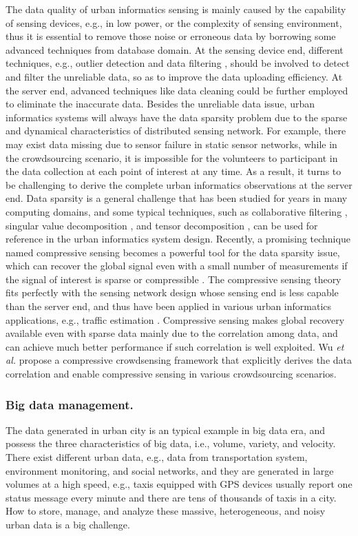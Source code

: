 The data quality of urban informatics sensing is mainly caused by the capability of sensing devices, e.g., in low power, or the complexity of sensing environment, thus it is essential to remove those noise or erroneous data by borrowing some advanced techniques from database domain. At the sensing device end, different techniques, e.g., outlier detection \cite{outlier} and data filtering \cite{crowdscreen}, should be involved to detect and filter the unreliable data, so as to improve the data uploading efficiency. At the server end, advanced techniques like data cleaning \cite{datacleaning} could be further employed to eliminate the inaccurate data. Besides the unreliable data issue, urban informatics systems will always have the data sparsity problem due to the sparse and dynamical characteristics of distributed sensing network. For example, there may exist data missing due to sensor failure in static sensor networks, while in the crowdsourcing scenario, it is impossible for the volunteers to participant in the data collection at each point of interest at any time. As a result, it turns to be challenging to derive the complete urban informatics observations at the server end. Data sparsity is a general challenge that has been studied for years in many computing domains, and some typical techniques, such as collaborative filtering \cite{cf}, singular value decomposition \cite{svd}, and tensor decomposition \cite{tensor}, can be used for reference in the urban informatics system design. Recently, a promising technique named compressive sensing becomes a powerful tool for the data sparsity issue, which can recover the global signal even with a small number of measurements if the signal of interest is sparse or compressible \cite{cs}. The compressive sensing theory fits perfectly with the sensing network design whose sensing end is less capable than the server end, and thus have been applied in various urban informatics applications, e.g., traffic estimation \cite{compressive}. Compressive sensing makes global recovery available even with sparse data mainly due to the correlation among data, and can achieve much better performance if such correlation is well exploited. Wu \textit{et al.} \cite{morecs} propose a compressive crowdsensing framework that explicitly derives the data correlation and enable compressive sensing in various crowdsourcing scenarios.

\subsubsection{\textbf{Big data management.}} The data generated in urban city is an typical example in big data era, and possess the three characteristics of big data, i.e., volume, variety, and velocity. There exist different urban data, e.g., data from transportation system, environment monitoring, and social networks, and they are generated in large volumes at a high speed, e.g., taxis equipped with GPS devices usually report one status message every minute and there are tens of thousands of taxis in a city. How to store, manage, and analyze these massive, heterogeneous, and noisy urban data is a big challenge.

